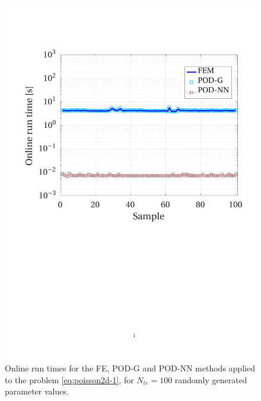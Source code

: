 \documentclass[12pt, a4paper, twoside, openright]{report}
\numberwithin{equation}{chapter}
\theoremstyle{theorem}
\theoremstyle{definition}
\theoremstyle{remark}
\theoremstyle{proposition}
\numberwithin{figure}{chapter}
\begin{document}
		\begin{figure}[H]
			\center
			\includegraphics[scale = 0.4, trim = {1.5cm 11cm 1.5cm 3.75cm}, clip]{poisson2d_1_time}
			
			\caption{Online run times for the FE, POD-G and POD-NN methods applied to the problem \eqref{eq:poisson2d-1}, for $N_{te} = 100$ randomly generated parameter values. }
			\label{fig:poisson2d-1-fig1}
		\end{figure}
		
\end{document}
